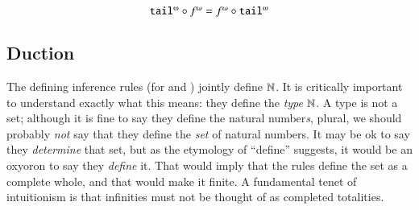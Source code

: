\begin{center}
\[
\mytikzmark{lhstl}{\cotail}\circ
\mytikzmark{lhsf}{\Lift{f}{\omega}} =
\mytikzmark{rhsf}{\Lift{f}{\omega}}\circ
\mytikzmark{rhstl}{\cotail}
\]


\end{center}

\subsection{Duction}

The defining inference rules (for \ZNat and \SNat) jointly define
\(\mathbb{N}\). It is critically important to understand exactly what this
means: they define the \textit{type} \(\mathbb{N}\). A type is not a set;
although it is fine to say they define the natural number\textit{s},
plural, we should probably \textit{not} say that they define the
\textit{set} of natural numbers. It may be ok to say they
\textit{determine} that set, but as the etymology of ``define''
suggests, it would be an oxyoron to say they \textit{define} it. That
would imply that the rules define the set as a complete whole, and
that would make it finite. A fundamental tenet of intuitionism is that
infinities must not be thought of as completed totalities.

